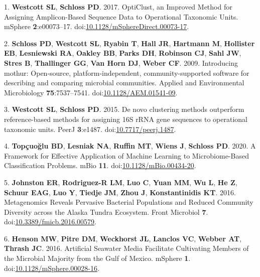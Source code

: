 \documentclass[
  12pt,
]{article}
\newenvironment{cslreferences}%
  {}%
  {\par}
\begin{document}
\hypertarget{refs}{}
\begin{cslreferences}
\leavevmode\hypertarget{ref-westcott_opticlust_2017}{}%
1. \textbf{Westcott SL}, \textbf{Schloss PD}. 2017. OptiClust, an
Improved Method for Assigning Amplicon-Based Sequence Data to
Operational Taxonomic Units. mSphere \textbf{2}:e00073--17.
doi:\href{https://doi.org/10.1128/mSphereDirect.00073-17}{10.1128/mSphereDirect.00073-17}.

\leavevmode\hypertarget{ref-schloss_introducing_2009}{}%
2. \textbf{Schloss PD}, \textbf{Westcott SL}, \textbf{Ryabin T},
\textbf{Hall JR}, \textbf{Hartmann M}, \textbf{Hollister EB},
\textbf{Lesniewski RA}, \textbf{Oakley BB}, \textbf{Parks DH},
\textbf{Robinson CJ}, \textbf{Sahl JW}, \textbf{Stres B},
\textbf{Thallinger GG}, \textbf{Van Horn DJ}, \textbf{Weber CF}. 2009.
Introducing mothur: Open-source, platform-independent,
community-supported software for describing and comparing microbial
communities. Applied and Environmental Microbiology
\textbf{75}:7537--7541.
doi:\href{https://doi.org/10.1128/AEM.01541-09}{10.1128/AEM.01541-09}.

\leavevmode\hypertarget{ref-westcott_novo_2015}{}%
3. \textbf{Westcott SL}, \textbf{Schloss PD}. 2015. De novo clustering
methods outperform reference-based methods for assigning 16S rRNA gene
sequences to operational taxonomic units. PeerJ \textbf{3}:e1487.
doi:\href{https://doi.org/10.7717/peerj.1487}{10.7717/peerj.1487}.

\leavevmode\hypertarget{ref-topcuoglu_framework_2020}{}%
4. \textbf{Topçuoğlu BD}, \textbf{Lesniak NA}, \textbf{Ruffin MT},
\textbf{Wiens J}, \textbf{Schloss PD}. 2020. A Framework for Effective
Application of Machine Learning to Microbiome-Based Classification
Problems. mBio \textbf{11}.
doi:\href{https://doi.org/10.1128/mBio.00434-20}{10.1128/mBio.00434-20}.

\leavevmode\hypertarget{ref-johnston_metagenomics_2016}{}%
5. \textbf{Johnston ER}, \textbf{Rodriguez-R LM}, \textbf{Luo C},
\textbf{Yuan MM}, \textbf{Wu L}, \textbf{He Z}, \textbf{Schuur EAG},
\textbf{Luo Y}, \textbf{Tiedje JM}, \textbf{Zhou J},
\textbf{Konstantinidis KT}. 2016. Metagenomics Reveals Pervasive
Bacterial Populations and Reduced Community Diversity across the Alaska
Tundra Ecosystem. Front Microbiol \textbf{7}.
doi:\href{https://doi.org/10.3389/fmicb.2016.00579}{10.3389/fmicb.2016.00579}.

\leavevmode\hypertarget{ref-henson_artificial_2016}{}%
6. \textbf{Henson MW}, \textbf{Pitre DM}, \textbf{Weckhorst JL},
\textbf{Lanclos VC}, \textbf{Webber AT}, \textbf{Thrash JC}. 2016.
Artificial Seawater Media Facilitate Cultivating Members of the
Microbial Majority from the Gulf of Mexico. mSphere \textbf{1}.
doi:\href{https://doi.org/10.1128/mSphere.00028-16}{10.1128/mSphere.00028-16}.


\end{cslreferences}
\end{document}
